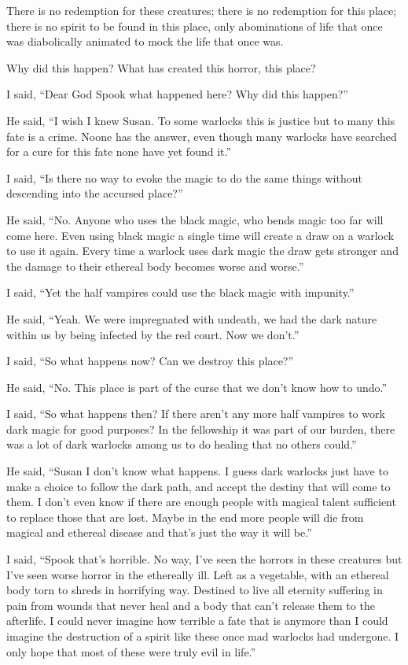 There is no redemption for these creatures; there is no redemption for this place; there is no spirit to be found in this place, only abominations of life that once was diabolically animated to mock the life that once was.

Why did this happen? What has created this horror, this place?

I said, ``Dear God Spook what happened here? Why did this happen?''

He said, ``I wish I knew Susan. To some warlocks this is justice but to many this fate is a crime. Noone has the answer, even though many warlocks have searched for a cure for this fate none have yet found it.''

I said, ``Is there no way to evoke the magic to do the same things without descending into the accursed place?''

He said, ``No. Anyone who uses the black magic, who bends magic too far will come here. Even using black magic a single time will create a draw on a warlock to use it again. Every time a warlock uses dark magic the draw gets stronger and the damage to their ethereal body becomes worse and worse.''

I said, ``Yet the half vampires could use the black magic with impunity.''

He said, ``Yeah. We were impregnated with undeath, we had the dark nature within us by being infected by the red court. Now we don't.''

I said, ``So what happens now? Can we destroy this place?''

He said, ``No. This place is part of the curse that we don't know how to undo.''

I said, ``So what happens then? If there aren't any more half vampires to work dark magic for good purposes? In the fellowship it was part of our burden, there was a lot of dark warlocks among us to do healing that no others could.''

He said, ``Susan I don't know what happens. I guess dark warlocks just have to make a choice to follow the dark path, and accept the destiny that will come to them. I don't even know if there are enough people with magical talent sufficient to replace those that are lost. Maybe in the end more people will die from magical and ethereal disease and that's just the way it will be.''

I said, ``Spook that's horrible. No way, I've seen the horrors in these creatures but I've seen worse horror in the ethereally ill. Left as a vegetable, with an ethereal body torn to shreds in horrifying way. Destined to live all eternity suffering in pain from wounds that never heal and a body that can't release them to the afterlife. I could never imagine how terrible a fate that is anymore than I could imagine the destruction of a spirit like these once mad warlocks had undergone. I only hope that most of these were truly evil in life.''

